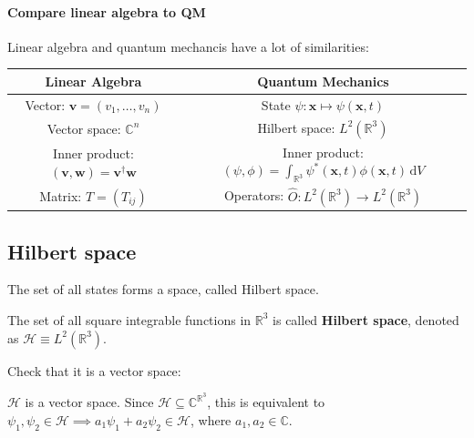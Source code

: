 \documentclass[a4paper]{article}
\begin{document}
\paragraph{Compare linear algebra to QM} Linear algebra and quantum mechancis have a lot of similarities: 
\begin{center}
\begin{tabular}{cc}
    \toprule 
    \textbf{Linear Algebra} & \textbf{Quantum Mechanics} \\ \midrule
    Vector: $\displaystyle \mathbf{v} = (v_1,\dots,v_n)$ & State $ \psi: \mathbf{x} \mapsto \psi(\mathbf{x},t) $ \\[0.4em] 
    Vector space: $ \mathbb{C}^n $ & Hilbert space: $ L^2( \mathbb{R}^{3}) $ \\[0.4em]  
    Inner product: $ (\mathbf{v},\mathbf{w}) = \mathbf{v}^\dagger \mathbf{w} $ & Inner product: $\displaystyle (\psi,\phi) = \int_{\mathbb{R}^3} \psi^*(\mathbf{x},t)\phi(\mathbf{x},t) \,\mathrm{d}V$ \\[1em]  
    Matrix: $ T = (T_{ij}) $ & Operators: $ \hat{O}: L^2( \mathbb{R}^{3})\to L^2( \mathbb{R}^{3}) $\\
    \bottomrule
\end{tabular}
\end{center}

\subsection{Hilbert space}
The set of all states forms a space, called Hilbert space. 
\begin{definition}
    The set of all square integrable functions in $ \mathbb{R}^3 $ is called \textbf{Hilbert space}, denoted as $ \mathcal{H} \equiv L^2(\mathbb{R}^3) $.
\end{definition}
Check that it is a vector space: 
\begin{proposition}
    $ \mathcal{H} $ is a vector space. Since $ \mathcal{H} \subseteq \mathbb{C}^{\mathbb{R}^3} $, this is equivalent to $ \psi_1,\psi_2\in \mathcal{H} \implies a_1 \psi_1+a_2\psi_2\in \mathcal{H} $, where $ a_1,a_2\in \mathbb{C} $.
\end{proposition}
\end{document}
